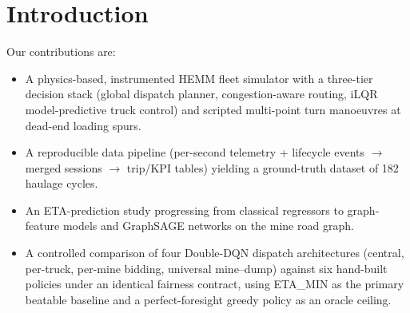 \section{Introduction}


Our contributions are:
\begin{itemize}
  \item A physics-based, instrumented HEMM fleet simulator with a
        three-tier decision stack (global dispatch planner, congestion-aware
        routing, iLQR model-predictive truck control) and scripted
        multi-point turn manoeuvres at dead-end loading spurs. %
  \item A reproducible data pipeline (per-second telemetry + lifecycle
        events $\rightarrow$ merged sessions $\rightarrow$ trip/KPI tables)
        yielding a ground-truth dataset of 182 haulage cycles. %
  \item An ETA-prediction study progressing from classical regressors to
        graph-feature models and GraphSAGE networks on the mine road graph. %
  \item A controlled comparison of four Double-DQN dispatch architectures
        (central, per-truck, per-mine bidding, universal mine--dump) against
        six hand-built policies under an identical fairness contract, using
        ETA\_MIN as the primary beatable baseline and a perfect-foresight
        greedy policy as an oracle ceiling. %
\end{itemize}

